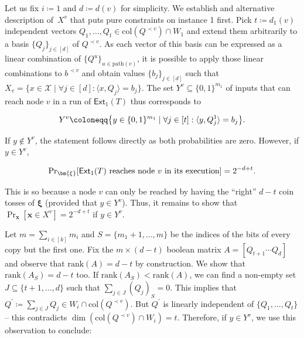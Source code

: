 \documentclass[10pt,a4paper]{article}
\begin{document}
Let us fix $i\coloneqq 1$ and $d\coloneqq d(v)$ for simplicity. We establish and alternative description of $X^{v}$ that puts pure constraints on instance 1 first. Pick $t\coloneqq d_{1}(v)$ independent vectors $Q_{1},\ldots,Q_{t}\in\mathrm{col}(Q^{\prec v})\cap W_{1}$ and extend them arbitrarily to a basis $\{Q_{j}\}_{j\in[d]}$ of $Q^{\prec v}$. As each vector of this basis can be expressed as a linear combination of $\{Q^{u}\}_{u\in\mathrm{path}(v)}$, it is possible to apply those linear combinations to $b^{\prec v}$ and obtain values $\{b_{j}\}_{j\in[d]}$ such that $X_{v}=\{x\in\mathcal{X}\mid\forall j\in[d]:\langle x,Q_{j}\rangle=b_{j}\}$. The set $Y^{v}\subseteq\{0,1\}^{m_{1}}$ of inputs that can reach node $v$ in a run of $\mathsf{Ext}_{1}\mathopen{}\left(T\mathclose{}\right)$ thus corresponds to\par


\[\begin{gathered}
Y^{v}\coloneqq\big{\{}y\in\{0,1\}^{m_{1}}\mid\forall j\in[t]:\langle y,Q_{j}^{1}\rangle=b_{j}\big{\}}.
\end{gathered}\]


If $y\notin Y^{v}$, the statement follows directly as both probabilities are zero. However, if $y\in Y^{v}$,\par


\[\begin{gathered}
\Pr\nolimits_{\bm{\xi}}[\textup{$\mathsf{Ext}_{1}\mathopen{}\left(T\mathclose{}\right)$ reaches node $v$ in its execution}]=2^{-d+t}.
\end{gathered}\]


This is so because a node $v$ can only be reached by having the “right” $d-t$ coin tosses of $\bm{\xi}$ (provided that $y\in Y^{v}$). Thus, it remains to show that $\Pr_{\bm{x}}[\bm{x}\in X^{v}]=2^{-d+t}$ if $y\in Y^{v}$.\par




Let $m=\sum_{i\in[k]}m_{i}$ and $S=\{m_{1}+1,\dots,m\}$ be the indices of the bits of every copy but the first one. Fix the $m\times(d-t)$ boolean matrix $A=[Q_{t+1}\cdots Q_{d}]$ and observe that $\mathrm{rank}(A)=d-t$ by construction. We show that $\mathrm{rank}(A_{S})=d-t$ too. If $\mathrm{rank}(A_{S})<\mathrm{rank}(A)$, we can find a non-empty set $J\subseteq\{t+1,\ldots,d\}$ such that $\sum_{j\in J}(Q_{j})_{S}=0$. This implies that $Q^{\prime}\coloneqq\sum_{j\in J}Q_{j}\in W_{i}\cap\mathrm{col}(Q^{\prec v})$. But $Q^{\prime}$ is linearly independent of $\{Q_{1},\ldots,Q_{t}\}$ – this contradicts $\dim(\mathrm{col}(Q^{\prec v})\cap W_{i})=t$. Therefore, if $y\in Y^{v}$, we use this observation to conclude:\par
\end{document}

